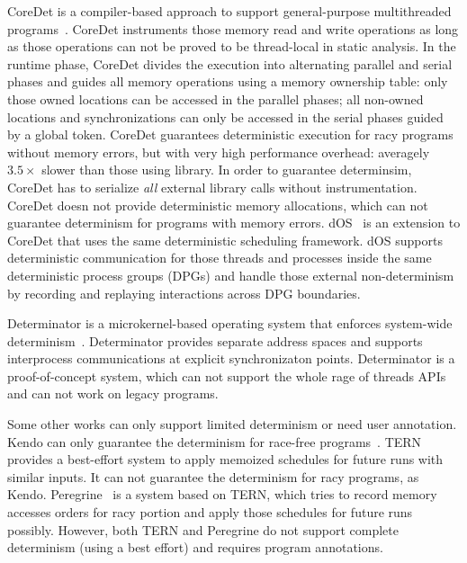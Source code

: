 CoreDet is a compiler-based approach to 
support general-purpose multithreaded programs~\cite{Bergan:2010:CCR:1736020.1736029}. 
CoreDet instruments those memory read and write operations as long
as those operations can not be proved to be thread-local in static analysis. 
In the runtime phase, CoreDet divides the execution into 
alternating parallel and serial phases and guides all memory operations 
using a memory ownership table: only those owned locations can be accessed
in the parallel phases; all non-owned locations and synchronizations can only 
be accessed in the serial phases guided by a global token.
CoreDet guarantees deterministic execution for racy programs without memory errors,
but with very high performance overhead: 
averagely $3.5\times$ slower than those using \pthreads{} library.
In order to guarantee determinsim, 
CoreDet has to serialize \emph{all} external library calls without instrumentation.
CoreDet doesn not provide deterministic 
memory allocations, which can not guarantee determinism for programs with memory errors.  
dOS~\cite{deterministic-process-groups} is an extension to CoreDet
that uses the same deterministic scheduling framework.  dOS 
supports deterministic communication for those threads and processes inside the same
deterministic process groups (DPGs) and handle those external non-determinism by recording and
replaying interactions across DPG boundaries. 

Determinator is a microkernel-based operating system that enforces
system-wide determinism~\cite{efficient-system-enforced}.
Determinator provides separate address spaces and supports interprocess
communications at explicit synchronizaton points. 
Determinator is a proof-of-concept system, which can not support the whole rage of
threads APIs and can not work on legacy programs.  

Some other works can only support limited determinism or need user annotation.
Kendo can only guarantee the determinism for race-free programs~\cite{1508256}. 
TERN~\cite{stable-deterministic} provides a best-effort system to 
apply memoized schedules for future runs with similar inputs. 
It can not guarantee the determinism for racy programs, as Kendo. 
Peregrine~\cite{peregrine:sosp11} is a system based on TERN, which tries to record
 memory accesses orders for racy portion and apply those schedules for future runs possibly.
However, both TERN and Peregrine do not support complete determinism (using a best effort)
and requires program annotations. 

